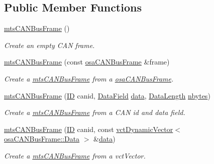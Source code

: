 \subsection*{Public Member Functions}
\begin{DoxyCompactItemize}
\item 
\hyperlink{classmts_c_a_n_bus_frame_ab0b58884accaf6b048241882c90cf31c}{mts\+C\+A\+N\+Bus\+Frame} ()
\begin{DoxyCompactList}\small\item\em Create an empty C\+A\+N frame. \end{DoxyCompactList}\item 
\hyperlink{classmts_c_a_n_bus_frame_a3db84ff04b7d9c5a7f88704e1d4b4871}{mts\+C\+A\+N\+Bus\+Frame} (const \hyperlink{classosa_c_a_n_bus_frame}{osa\+C\+A\+N\+Bus\+Frame} \&frame)
\begin{DoxyCompactList}\small\item\em Create a \hyperlink{classmts_c_a_n_bus_frame}{mts\+C\+A\+N\+Bus\+Frame} from a \hyperlink{classosa_c_a_n_bus_frame}{osa\+C\+A\+N\+Bus\+Frame}. \end{DoxyCompactList}\item 
\hyperlink{classmts_c_a_n_bus_frame_ac3fe2d8ad4bbdcb44fc40c2ba1fecdc7}{mts\+C\+A\+N\+Bus\+Frame} (\hyperlink{classosa_c_a_n_bus_frame_ae917bcfe6427b2055a405716909c6048}{I\+D} canid, \hyperlink{classosa_c_a_n_bus_frame_ac41162892eefb85a1308d485ec630969}{Data\+Field} \hyperlink{classosa_c_a_n_bus_frame_ae5114021468fe3ca35f95ec123db1e2d}{data}, \hyperlink{classosa_c_a_n_bus_frame_ab5bacbd4959a9046925438af889744f4}{Data\+Length} \hyperlink{classosa_c_a_n_bus_frame_abc694b0742e9c5b7e2db8640caa17565}{nbytes})
\begin{DoxyCompactList}\small\item\em Create a \hyperlink{classmts_c_a_n_bus_frame}{mts\+C\+A\+N\+Bus\+Frame} from a C\+A\+N id and data field. \end{DoxyCompactList}\item 
\hyperlink{classmts_c_a_n_bus_frame_acc63f8714da9aa70e92d26862e1be54a}{mts\+C\+A\+N\+Bus\+Frame} (\hyperlink{classosa_c_a_n_bus_frame_ae917bcfe6427b2055a405716909c6048}{I\+D} canid, const \hyperlink{classvct_dynamic_vector}{vct\+Dynamic\+Vector}$<$ \hyperlink{classosa_c_a_n_bus_frame_a938f540c9de33b240d3bc4f21c341ba5}{osa\+C\+A\+N\+Bus\+Frame\+::\+Data} $>$ \&\hyperlink{classosa_c_a_n_bus_frame_ae5114021468fe3ca35f95ec123db1e2d}{data})
\begin{DoxyCompactList}\small\item\em Create a \hyperlink{classmts_c_a_n_bus_frame}{mts\+C\+A\+N\+Bus\+Frame} from a vct\+Vector. \end{DoxyCompactList}\end{DoxyCompactItemize}
